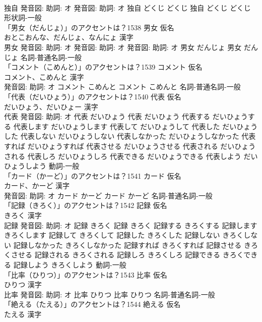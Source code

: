 \documentclass[8pt]{extreport}
\begin{document}
\begin{CJK}{UTF8}{min}
\\	独自 発音図: 助詞: オ 発音図: 助詞: オ	独自 どくじ どくじ		独自 どくじ どくじ				形状詞-一般 
\\	「男女（だんじょ）」のアクセントは？1538	男女 仮名　
\\	おとこおんな、だんじょ、なんにょ 漢字　
\\	男女 発音図: 助詞: オ 発音図: 助詞: オ 発音図: 助詞: オ	男女 だんじょ		男女 だんじょ				名詞-普通名詞-一般 
\\	「コメント（こめんと）」のアクセントは？1539	コメント 仮名　
\\	コメント、こめんと 漢字　
\\	発音図: 助詞: オ	コメント こめんと		コメント こめんと				名詞-普通名詞-一般 
\\	「代表（だいひょう）」のアクセントは？1540	代表 仮名　
\\	だいひょう、だいひょー 漢字　
\\	代表 発音図: 助詞: オ	代表 だいひょう		代表 だいひょう 代表する だいひょうする 代表します だいひょうします 代表して だいひょうして 代表した だいひょうした 代表しない だいひょうしない 代表しなかった だいひょうしなかった 代表すれば だいひょうすれば 代表させる だいひょうさせる 代表される だいひょうされる 代表しろ だいひょうしろ 代表できる だいひょうできる 代表しよう だいひょうしよう				動詞-一般 
\\	「カード（かーど）」のアクセントは？1541	カード 仮名　
\\	カード、かーど 漢字　
\\	発音図: 助詞: オ	カード かーど		カード かーど				名詞-普通名詞-一般 
\\	「記録（きろく）」のアクセントは？1542	記録 仮名　
\\	きろく 漢字　
\\	記録 発音図: 助詞: オ	記録 きろく		記録 きろく 記録する きろくする 記録します きろくします 記録して きろくして 記録した きろくした 記録しない きろくしない 記録しなかった きろくしなかった 記録すれば きろくすれば 記録させる きろくさせる 記録される きろくされる 記録しろ きろくしろ 記録できる きろくできる 記録しよう きろくしよう				動詞-一般 
\\	「比率（ひりつ）」のアクセントは？1543	比率 仮名　
\\	ひりつ 漢字　
\\	比率 発音図: 助詞: オ	比率 ひりつ		比率 ひりつ				名詞-普通名詞-一般 
\\	「絶える（たえる）」のアクセントは？1544	絶える 仮名　
\\	たえる 漢字　

\end{CJK}
\end{document}
